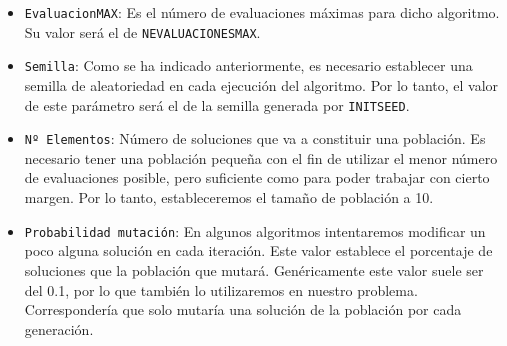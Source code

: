 \begin{itemize}
	\item \texttt{EvaluacionMAX}: Es el número de evaluaciones máximas para dicho algoritmo. 
Su valor será el de \texttt{NEVALUACIONESMAX}.
	\item \texttt{Semilla}: Como se ha indicado anteriormente, es necesario establecer una semilla de aleatoriedad en cada ejecución del algoritmo. 
Por lo tanto, el valor de este parámetro será el de la semilla generada por \texttt{INITSEED}. 
	\item \texttt{Nº Elementos}: Número de soluciones que va a constituir una población. 
Es necesario tener una población pequeña con el fin de utilizar el menor número de evaluaciones posible, pero suficiente como para poder trabajar con cierto margen. 
Por lo tanto, estableceremos el tamaño de población a 10. 
	\item \texttt{Probabilidad mutación}: En algunos algoritmos intentaremos modificar un poco alguna solución en cada iteración. 
Este valor establece el porcentaje de soluciones que la población que mutará. 
Genéricamente este valor suele ser del 0.1, por lo que también lo utilizaremos en nuestro problema. 
Correspondería que solo mutaría una solución de la población por cada generación. 
\end{itemize}



